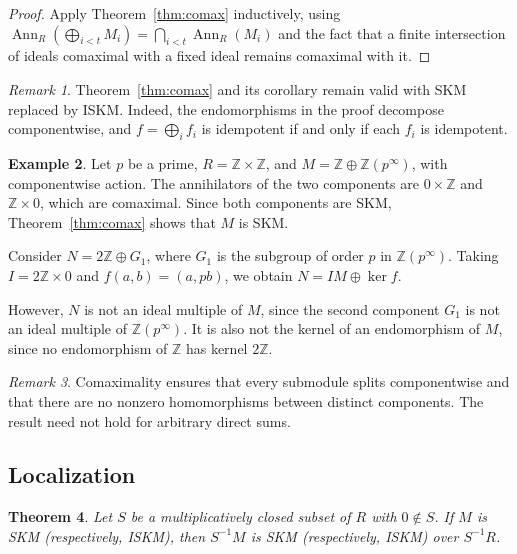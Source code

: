 \documentclass[11pt,a4paper]{article}
\newtheorem{theorem}{Theorem}[section]
\theoremstyle{definition}
\newtheorem{example}[theorem]{Example}
\theoremstyle{remark}
\newtheorem{remark}[theorem]{Remark}
\begin{document}
\begin{proof}
Apply Theorem~\ref{thm:comax} inductively, using
$\operatorname{Ann}_R(\bigoplus_{i<t}M_i)
=\bigcap_{i<t}\operatorname{Ann}_R(M_i)$
and the fact that a finite intersection of ideals
comaximal with a fixed ideal remains comaximal with it.
\end{proof}


\begin{remark}\label{rem:iskmprod}
Theorem~\ref{thm:comax} and its corollary
remain valid with SKM replaced by ISKM.
Indeed, the endomorphisms in the proof
decompose componentwise, and
$f=\bigoplus_i f_i$ is idempotent if and
only if each $f_i$ is idempotent.
\end{remark}

\begin{example}
Let $p$ be a prime, $R=\mathbb Z\times\mathbb Z$, and
$M=\mathbb Z\oplus\mathbb Z(p^\infty)$, with componentwise
action. The annihilators of the two components are
$0\times\mathbb Z$ and $\mathbb Z\times0$, which are
comaximal. Since both components are SKM,
Theorem~\ref{thm:comax} shows that $M$ is SKM.

Consider $N=2\mathbb Z\oplus G_1$, where $G_1$ is the
subgroup of order $p$ in $\mathbb Z(p^\infty)$.
Taking $I=2\mathbb Z\times0$ and
$f(a,b)=(a,pb)$, we obtain
$N=IM\oplus\ker f$.

However, $N$ is not an ideal multiple of $M$, since
the second component $G_1$ is not an ideal multiple
of $\mathbb Z(p^\infty)$. It is also not the kernel
of an endomorphism of $M$, since no endomorphism
of $\mathbb Z$ has kernel $2\mathbb Z$.
\end{example}

\begin{remark}
Comaximality ensures that every submodule splits
componentwise and that there are no nonzero
homomorphisms between distinct components.
The result need not hold for arbitrary direct sums.
\end{remark}

\subsection{Localization}

\begin{theorem}\label{thm:loc}
Let $S$ be a multiplicatively closed subset of $R$ with $0\notin S$. If $M$ is SKM (respectively, ISKM), then $S^{-1}M$ is SKM (respectively, ISKM) over $S^{-1}R$.
\end{theorem}
\end{document}
